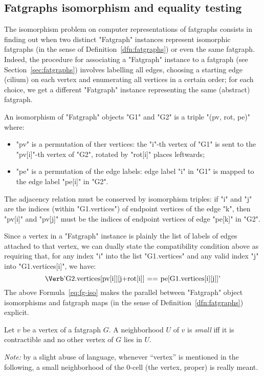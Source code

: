 \subsection{Fatgraphs isomorphism and equality testing}
\label{sec:isomorphism}

The isomorphism problem on computer representations of fatgraphs
consists in finding out when two distinct "Fatgraph" instances
represent isomorphic fatgraphs (in the sense of
Definition~\ref{dfn:fatgraphs}) or even the same fatgraph.  Indeed,
the procedure for associating a "Fatgraph" instance to a fatgraph (see
Section~\ref{sec:fatgraphs}) involves labelling all edges, choosing a
starting edge (cilium) on each vertex and enumerating all vertices in
a certain order; for each choice, we get a different "Fatgraph"
instance representing the same (abstract) fatgraph.

\begin{definition}
  An isomorphism of "Fatgraph" objects "G1" and "G2" is a triple 
  "(pv, rot, pe)" where:
  \begin{itemize}
  \item "pv" is a permutation of ther vertices: the "i"-th vertex of
    "G1" is sent to the "pv[i]"-th vertex of "G2", rotated by "rot[i]"
    places leftwards;
  \item "pe" is a permutation of the edge labels: edge label "i" in
    "G1" is mapped to the edge label "pe[i]" in "G2".
  \end{itemize}
  The adjacency relation must be conserved by isomorphism triples: if
  "i" and "j" are the indices (within "G1.vertices") of endpoint
  vertices of the edge "k", then "pv[i]" and "pv[j]" must be the
  indices of endpoint vertices of edge "pe[k]" in "G2".
\end{definition}
Since a vertex in a "Fatgraph" instance is plainly the list of labels
of edges attached to that vertex, we can dually state the
compatibility condition above as requiring that, for any index "i"
into the list "G1.vertices" and any valid index "j" into
"G1.vertices[i]", we have:
\begin{equation}
  \label{eq:fg-iso}
  \text{\protect\Verb'G2.vertices[pv[i]][j+rot[i]] == pe[G1.vertices[i][j]]'}
\end{equation}
The above Formula~\eqref{eq:fg-iso} makes the parallel between "Fatgraph" object
isomorphisms and fatgraph maps (in the sense of
Definition~\ref{dfn:fatgraphs}) explicit.

\begin{definition}
  Let $v$ be a vertex of a fatgraph $G$.  A neighborhood $U$ of $v$ is
  \emph{small} iff it is contractible and no other vertex of $G$ lies
  in $U$.
\end{definition}
\emph{Note:} by a slight abuse of language, whenever ``vertex'' is
mentioned in the following, a small neighborhood of the 0-cell (the
vertex, proper) is really meant.


